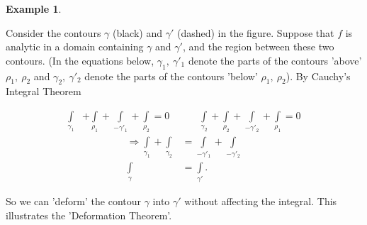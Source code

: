 \documentclass[12pt, a4paper]{article}
\theoremstyle{plain}
\theoremstyle{definition}
\newtheorem{example}{Example} %
\begin{document}
			\begin{example}
				\begin{multicols}{2}
					Consider the contours $\gamma$ (black) and $\gamma'$ (dashed) in the figure. Suppose that $f$ is analytic in a domain containing $\gamma$ and $\gamma'$, and the region between these two contours. (In the equations below, $\gamma_1,\:\gamma'_1$ denote the parts of the contours 'above' $\rho_1,\:\rho_2$ and $\gamma_2,\:\gamma'_2$ denote the parts of the contours 'below' $\rho_1,\:\rho_2$). By Cauchy's Integral Theorem
					\begin{figure}[H]
					\centering
					\end{figure}
				\end{multicols}
				\begin{align*}
						\int\limits_{\gamma_1} &+ 
						\int\limits_{\rho_1} + 
						\int\limits_{-\gamma'_1}+
						\int\limits_{\rho_2} = 0\quad\quad\quad
						\int\limits_{\gamma_2} + 
						\int\limits_{\rho_2} + 
						\int\limits_{-\gamma'_2}+
						\int\limits_{\rho_1} = 0
					\end{align*}
					\begin{align*}
						\Rightarrow \int\limits_{\gamma_1} + \int\limits_{\gamma_2} &=
						 \int\limits_{-\gamma'_1} + \int\limits_{-\gamma'_2} \\
						 \int\limits_{\gamma} &= \int\limits_{\gamma'}.
					\end{align*}
			\end{example}
			So we can 'deform' the contour $\gamma$ into $\gamma'$ without affecting the integral. This illustrates the 'Deformation Theorem'.
\end{document}
